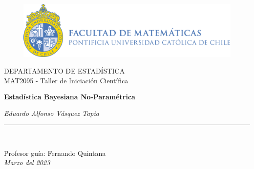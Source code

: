 \begin{titlepage}
\begin{center}

\vspace*{-0.7in}
\begin{figure}[htb]
\begin{center}
\includegraphics[width=12cm]{figures/logo.png}
\end{center}
\end{figure}
\Large DEPARTAMENTO DE ESTADÍSTICA\\

\Large MAT2095 - Taller de Iniciación Científica\\
\vspace*{1in}

\begin{large}

\Huge \textbf{Estadística Bayesiana No-Paramétrica} \\
\end{large}
\vspace*{1.2in}

\vspace*{0.5in}
\begin{large}
\textit{Eduardo Alfonso Vásquez Tapia}\\
\end{large}
\vspace*{0.5in}
\rule{80mm}{0.1mm}\\
\vspace*{0.5in}
\begin{large}
Profesor guía: Fernando Quintana \\
\vspace*{0.5in}
\textit{Marzo del 2023}
\end{large}
\end{center}
\end{titlepage}